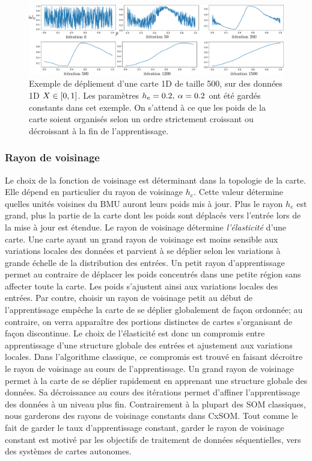 \documentclass[../main]{subfiles}
\begin{document}
\begin{figure}
\centering
\includegraphics[width=\textwidth]{depliement_1D.pdf}
\caption{Exemple de dépliement d'une carte 1D de taille 500, sur des données 1D $X \in [0,1]$. Les paramètres $h_{e} = 0.2, \: \alpha = 0.2$ ont été gardés constants dans cet exemple. On s'attend à ce que les poids de la carte soient organisés selon un ordre strictement croissant ou décroissant à la fin de l'apprentissage.}
\label{fig:depliement}
\end{figure}

\subsubsection{Rayon de voisinage}
Le choix de la fonction de voisinage est déterminant dans la topologie de la carte. Elle dépend en particulier du rayon de voisinage $h_e$.
Cette valeur détermine quelles unités voisines du BMU auront leurs poids mis à jour.
Plus le rayon $h_e$ est grand, plus la partie de la carte dont les poids sont déplacés vers l'entrée lors de la mise à jour est étendue. 
Le rayon de voisinage détermine \emph{l'élasticité} d'une carte. Une carte ayant un grand rayon de voisinage est moins sensible aux variations locales des données et parvient à se déplier selon les variations à grande échelle de la distribution des entrées.
Un petit rayon d'apprentissage permet au contraire de déplacer les poids concentrés dans une petite région sans affecter toute la carte. Les poids s'ajustent ainsi aux variations locales des entrées. Par contre, choisir un rayon de voisinage petit au début de l'apprentissage empêche la carte de se déplier globalement de façon ordonnée; au contraire, on verra apparaître des portions distinctes de cartes s'organisant de façon discontinue.
Le choix de l'élasticité est donc un compromis entre apprentissage d'une structure globale des entrées et ajustement aux variations locales.
Dans l'algorithme classique, ce compromis est trouvé en faisant décroitre le rayon de voisinage au cours de l'apprentissage. Un grand rayon de voisinage permet à la carte de se déplier rapidement en apprenant une structure globale des données. Sa décroissance au cours des itérations permet d'affiner l'apprentissage des données à un niveau plus fin. 
Contrairement à la plupart des SOM classiques, nous garderons des rayons de voisinage constants dans CxSOM. Tout comme le fait de garder le taux d'apprentissage constant, garder le rayon de voisinage constant est motivé par les objectifs de traitement de données séquentielles, vers des systèmes de cartes autonomes.
\end{document}
